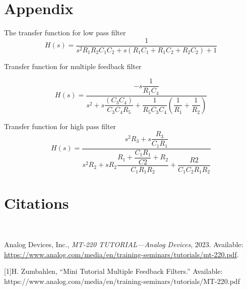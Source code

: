 \documentclass[12pt,a4paper]{article}
\begin{document}
    \newpage
    \section*{Appendix}

    The transfer function for low pass filter
        \begin{equation}
            H(s)=\dfrac{1}{s^2 R_1 R_2 C_1 C_2+s\left(R_1 C_1+R_1 C_2+R_2 C_2\right)+1}            
        \end{equation}
    
    \vspace{2em}     
    Transfer function for multiple feedback filter

        \begin{equation}
            H(s)=\dfrac{-s \dfrac{1}{R_1 C_4}}{s^2+s \dfrac{(C_3C_4)}{C_3 C_4 R_5}+\dfrac{1}{R_5 C_3 C_4}\left(\dfrac{1}{R_1}+\dfrac{1}{R_2}\right)}
        \end{equation}
    \vspace{2em}     
    
    Transfer function for high pass filter
        \begin{equation}
            H(s)=\dfrac{s^2R_3+s\dfrac{R_3}{C_1R_1}}{s^2R_2+sR_2\dfrac{R_1+\dfrac{C_1R_1}{C2}+R_2}{C_1R_1R_2} + \dfrac{R2}{C_1C_2R_1R_2}}
        \end{equation}
        \newpage
    
    \section*{Citations}
    
    ~\cite{analog_mt220}

    \begin{thebibliography}{1}
        Analog Devices, Inc., \emph{MT-220 TUTORIAL—Analog Devices}, 2023. Available: \url{https://www.analog.com/media/en/training-seminars/tutorials/mt-220.pdf}.
    \end{thebibliography}

    [1]\hspace{2em}H. Zumbahlen, “Mini Tutorial Multiple Feedback Filters.”
    Available: https://www.analog.com/media/en/training-seminars/tutorials/MT-220.pdf
\end{document}
